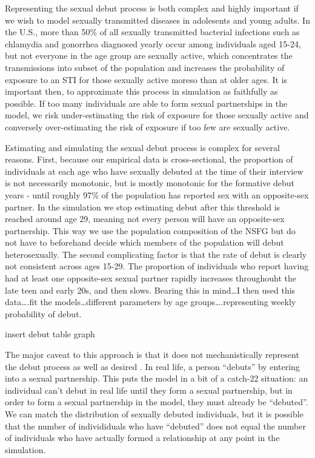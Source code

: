 \documentclass [11pt, proquest] {uwthesis}[2015/03/03]
\begin{document}
Representing the sexual debut process is both complex and highly
important if we wish to model sexually transmitted diseases in
adolesents and young adults. In the U.S., more than 50\% of all sexually
transmitted bacterial infections such as chlamydia and gonorrhea
diagnosed yearly occur among individuals aged 15-24, but not everyone in
the age group are sexually active, which concentrates the transmissions
into subset of the population and increases the probability of exposure
to an STI for those sexually active moreso than at older ages. It is
important then, to approximate this process in simulation as faithfully
as possible. If too many individuals are able to form sexual
partnerships in the model, we risk under-estimating the risk of exposure
for those sexually active and conversely over-estimating the risk of
exposure if too few are sexually active.

Estimating and simulating the sexual debut process is complex for
several reasons. First, because our empirical data is cross-sectional,
the proportion of individuals at each age who have sexually debuted at
the time of their interview is not necessarily monotonic, but is mostly
monotonic for the formative debut years - until roughly 97\% of the
population has reported sex with an opposite-sex partner. In the
simulation we stop estimating debut after this threshold is reached
around age 29, meaning not every person will have an opposite-sex
partnership. This way we use the population composition of the NSFG but
do not have to beforehand decide which members of the population will
debut heterosexually. The second complicating factor is that the rate of
debut is clearly not consistent across ages 15-29. The proportion of
individuals who report having had at least one opposite-sex sexual
partner rapidly increases throughouht the late teen and early 20s, and
then slows. Bearing this in mind\ldots{}I then used this
data\ldots{}.fit the models\ldots{}different parameters by age
groups\ldots{}.representing weekly probability of debut.

insert debut table graph

The major caveat to this approach is that it does not mechanistically
represent the debut process as well as desired . In real life, a person
``debuts'' by entering into a sexual partnership. This puts the model in
a bit of a catch-22 situation: an individual can't debut in real life
until they form a sexual partnership, but in order to form a sexual
partnership in the model, they must already be ``debuted''. We can match
the distribution of sexually debuted individuals, but it is possible
that the number of individiduals who have ``debuted'' does not equal the
number of individuals who have actually formed a relationship at any
point in the simulation.
\end{document}
